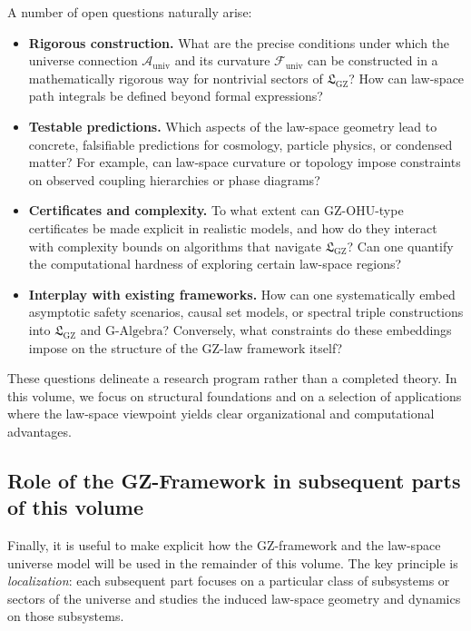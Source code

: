 \documentclass[11pt]{book}
\newcommand{\GAlgebra}{\text{G-Algebra}}
\newcommand{\GZLS}{\ensuremath{\mathfrak{L}_{\mathrm{GZ}}}}
\theoremstyle{plain}
\theoremstyle{definition}
\theoremstyle{remark}
\begin{document}
A number of open questions naturally arise:



\begin{itemize}
  \item \textbf{Rigorous construction.}
        What are the precise conditions under which the universe
        connection $\mathcal{A}_{\mathrm{univ}}$ and its curvature
        $\mathcal{F}_{\mathrm{univ}}$ can be constructed in a
        mathematically rigorous way for nontrivial sectors of
        $\GZLS$? How can law-space path integrals be defined beyond
        formal expressions?
  \item \textbf{Testable predictions.}
        Which aspects of the law-space geometry lead to concrete,
        falsifiable predictions for cosmology, particle physics, or
        condensed matter? For example, can law-space curvature or
        topology impose constraints on observed coupling hierarchies
        or phase diagrams?
  \item \textbf{Certificates and complexity.}
        To what extent can GZ-OHU-type certificates be made explicit
        in realistic models, and how do they interact with complexity
        bounds on algorithms that navigate $\GZLS$? Can one quantify
        the computational hardness of exploring certain law-space
        regions?
  \item \textbf{Interplay with existing frameworks.}
        How can one systematically embed asymptotic safety scenarios,
        causal set models, or spectral triple constructions into
        $\GZLS$ and $\GAlgebra$? Conversely, what constraints do
        these embeddings impose on the structure of the GZ-law
        framework itself?
\end{itemize}

These questions delineate a research program rather than a completed
theory. In this volume, we focus on structural foundations and on
a selection of applications where the law-space viewpoint yields
clear organizational and computational advantages.

\subsection{Role of the GZ-Framework in subsequent parts of this volume}
\label{subsec:role-gzframework-subsequent}


Finally, it is useful to make explicit how the GZ-framework and the
law-space universe model will be used in the remainder of this
volume. The key principle is \emph{localization}: each subsequent
part focuses on a particular class of subsystems or sectors of the
universe and studies the induced law-space geometry and dynamics on
those subsystems.
\end{document}
